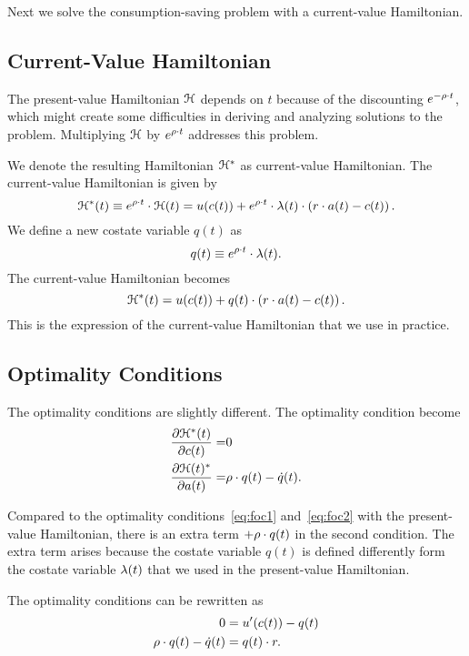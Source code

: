 \documentclass[letterpaper,12pt,leqno]{article}
\begin{document}
Next we solve the consumption-saving problem with a current-value Hamiltonian.

\subsection{Current-Value Hamiltonian}

The present-value Hamiltonian $\mathcal{H}$ depends on $t$ because of the discounting $e^{-\rho \cdot t}$, which might create some difficulties in deriving and analyzing solutions to the problem. Multiplying $\mathcal{H}$ by $e^{\rho \cdot t}$ addresses this problem. 

We denote the resulting Hamiltonian $\mathcal{H}^{*}$ as current-value Hamiltonian. The current-value Hamiltonian is given by
\begin{equation*}
\mathcal{H}^{*}(t)\equiv e^{\rho \cdot t}\cdot  \mathcal{H}(t)=u(c(t)) +e^{\rho \cdot t} \cdot \lambda(t) \cdot \left( r\cdot a(t)-c(t) \right).
\end{equation*}
We define a new costate variable $q(t)$ as
\begin{equation*}
q(t)\equiv  e^{\rho \cdot t} \cdot \lambda(t).
\end{equation*}
The current-value Hamiltonian becomes
\begin{equation*}
\mathcal{H}^{*}(t)= u(c(t)) +q(t) \cdot \left( r\cdot a(t)-c(t) \right).
\end{equation*}
This is the expression of the current-value Hamiltonian that we use in practice.

\subsection{Optimality Conditions}

The optimality conditions are slightly different. The optimality condition become
\begin{align*}
\frac{\partial \mathcal{H}^{*}(t)}{\partial c(t)}=& 0\\
\frac{\partial \mathcal{H}(t)^{*}}{\partial a(t)}=&\rho\cdot q(t)-\dot{q}(t).
\end{align*}

Compared to the optimality conditions~\eqref{eq:foc1} and~\eqref{eq:foc2} with the present-value Hamiltonian, there is an extra term $+\rho\cdot q(t)$ in the second condition. The extra term arises because the costate variable $q(t)$ is defined differently form the costate variable $\lambda(t)$ that we used in the present-value Hamiltonian. 

The optimality conditions can be rewritten as
\begin{align}
0 &= u'(c(t)) -q(t)\label{eq:auto1}\\
\rho\cdot q(t)-\dot{q}(t)&= q(t)\cdot  r .\label{eq:auto2}
\end{align}
\end{document}

